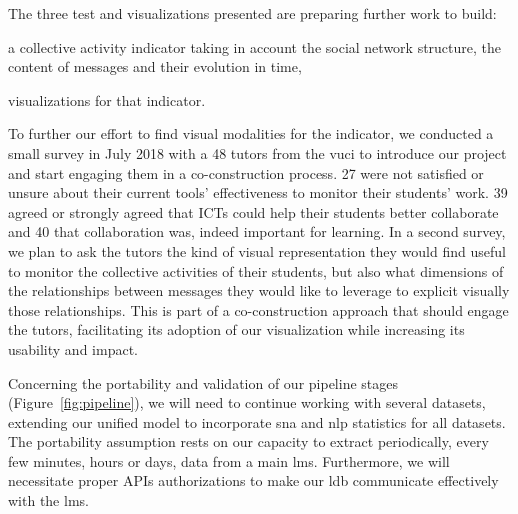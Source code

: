 \documentclass[a4paper,twoside]{article}
\begin{document}
The three test and visualizations presented are preparing further work to build:
\begin{inparaenum}
\item a collective activity indicator taking in account the social network structure, the content of messages and their evolution in time,
\item visualizations for that indicator.
\end{inparaenum}

To further our effort to find visual modalities for the indicator, we conducted a small survey in July 2018 with a 48 tutors from the \gls{vuci} to introduce our project and start engaging them in a co-construction process.   27 were not satisfied or unsure about their current tools' effectiveness to monitor their students' work.  39 agreed or strongly agreed that ICTs could help their students better collaborate and 40 that collaboration was, indeed important for learning.  In a second survey, we plan to ask the tutors the kind of visual representation they would find useful to monitor the collective activities of their students, but also what dimensions of the relationships between messages they would like to leverage to explicit visually those relationships.  This is part of a co-construction approach that should engage the tutors, facilitating its adoption of our visualization while increasing its usability and impact.

Concerning the portability and validation of our pipeline stages (Figure~\ref{fig:pipeline}),  we will need to continue working with several datasets, extending our unified model to incorporate \gls{sna} and \gls{nlp} statistics for all datasets. The portability assumption rests on our capacity to extract periodically, every few minutes, hours or days, data from a main \gls{lms}.  Furthermore, we  will necessitate proper APIs authorizations to make our \gls{ldb} communicate effectively with the \gls{lms}.

\end{document}
